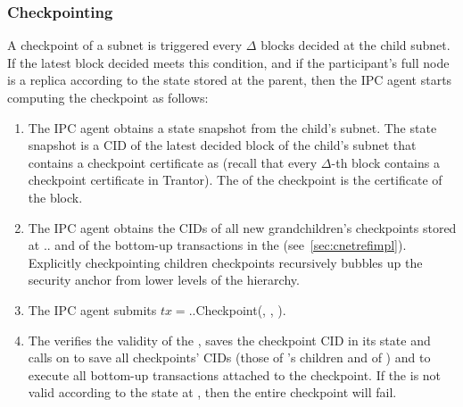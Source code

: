 \subsubsection{Checkpointing} 
\label{sec:refimplcheck} A checkpoint of a subnet  is triggered every $\Delta$ blocks decided at the child subnet. If the latest block decided meets this condition, and if the participant's full node is a replica according to the state stored at the parent, then the IPC agent starts computing the checkpoint as follows:
\begin{enumerate}
    \item The IPC agent obtains a state snapshot from the child's subnet. The state snapshot is a CID  of the latest decided block of the child's subnet that contains a checkpoint certificate as \pof  (recall that every $\Delta$-th block contains a checkpoint certificate in Trantor). The \pof of the checkpoint is the certificate of the block.
    \item The IPC agent obtains the CIDs of all new grandchildren's checkpoints stored at .\gw. and of the bottom-up transactions in the \bqueue {} (see~\cref{sec:cnetrefimpl}). Explicitly checkpointing children checkpoints recursively bubbles up the security anchor from lower levels of the hierarchy.
    \item The IPC agent submits $tx=$..Checkpoint(, , \pof).
    \item The  verifies the validity of the \pof, saves the checkpoint CID in its state and calls on \gw to save all checkpoints' CIDs (those of 's children and of ) and to execute all bottom-up transactions attached to the checkpoint. If the \pof is not valid according to the state at , then the entire checkpoint will fail.
\end{enumerate}
